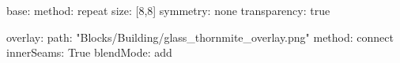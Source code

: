 base:
  method: repeat
  size: [8,8]
  symmetry: none
  transparency: true

overlay:
  path: "Blocks/Building/glass_thornmite_overlay.png"
  method: connect
  innerSeams: True
blendMode: add